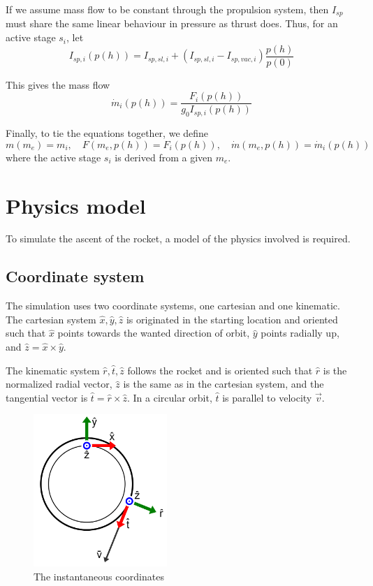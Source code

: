 \documentclass[11pt]{article}
\begin{document}
If we assume mass flow to be constant through the propulsion system, then $I_{sp}$ must share the same linear behaviour in pressure as thrust does.
Thus, for an active stage $s_i$, let
$$
I_{sp,i}(p(h)) = I_{sp,sl,i} + \left( I_{sp,sl,i} - I_{sp,vac,i} \right) \frac{p(h)}{p(0)}
$$

This gives the mass flow
$$
\dot{m}_i(p(h)) = \frac{F_i(p(h))}{ g_0 I_{sp,i}(p(h))}
$$

Finally, to tie the equations together, we define 
$$
m(m_e) = m_i, \quad 
F(m_e, p(h)) = F_i(p(h)), \quad 
\dot{m}(m_e, p(h)) = \dot{m}_i(p(h)) \quad 
$$
where the active stage $s_i$ is derived from a given $m_e$.

\section{Physics model}
To simulate the ascent of the rocket, a model of the physics involved is required.

\subsection{Coordinate system}
The simulation uses two coordinate systems, one cartesian and one kinematic.
The cartesian system $\hat{x}, \hat{y}, \hat{z}$ is originated in the starting location and oriented such that
$\hat{x}$ points towards the wanted direction of orbit,
$\hat{y}$ points radially up, and $\hat{z} = \hat{x} \times \hat{y}$.

The kinematic system $\hat{r}, \hat{t}, \hat{z}$ follows the rocket and is oriented such that 
$\hat{r}$ is the normalized radial vector, $\hat{z}$ is the same as in the cartesian system, 
and the tangential vector is $\hat{t} = \hat{r} \times \hat{z}$. In a circular orbit, $\hat{t}$ is parallel to velocity $\vec{v}$.

\begin{figure}[H]
  \centering
  \includegraphics[width=0.45\textwidth]{./orbit.png}
  \caption{The instantaneous coordinates}
\end{figure}
\end{document}
